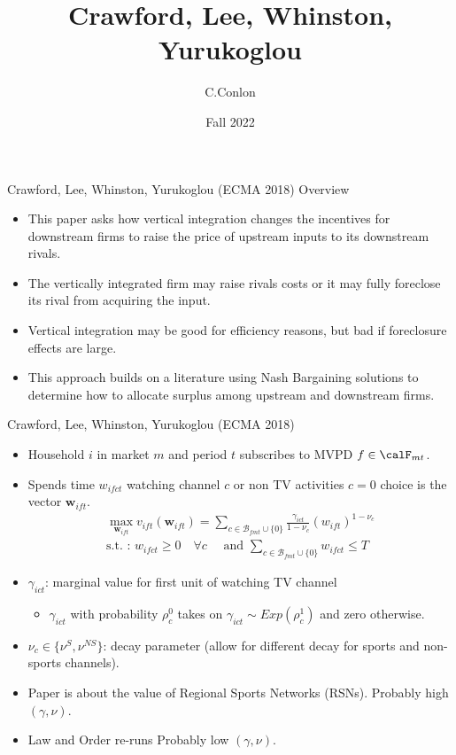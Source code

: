 

\title []{Crawford, Lee, Whinston, Yurukoglou}
\author{C.Conlon }
\date{Fall 2022}


\begin{frame}
\titlepage
\end{frame}




\begin{frame}{Crawford, Lee, Whinston, Yurukoglou (ECMA 2018)}
Overview
\begin{itemize}
\item This paper asks how vertical integration changes the incentives for \alert{downstream firms} to raise the price of upstream inputs to its downstream rivals.
\item The vertically integrated firm may \alert{raise rivals costs} or it may fully \alert{foreclose} its rival from acquiring the input.
\item Vertical integration may be good for efficiency reasons, but bad if foreclosure effects are large.
\item This approach builds on a literature using \alert{Nash Bargaining} solutions to determine how to allocate surplus among upstream and downstream firms.
\end{itemize}
\end{frame}

\begin{frame}{Crawford, Lee, Whinston, Yurukoglou (ECMA 2018)}
\begin{itemize}
\item Household $i$ in market $m$ and period $t$ subscribes to MVPD $f \in \calF_{mt}$.
\item Spends time $w_{ifct}$ watching channel $c$ or non TV activities $c=0$ choice is the vector $\symbf{w}_{ift}$.
\begin{eqnarray*}
\max_{\symbf{w}_{ift}} v_{ift}(\symbf{w}_{ift}) =  \sum_{c \in \mathcal{B}_{fmt} \cup \{0\}}  \frac{\gamma_{ict}}{1-\nu_c}(w_{ift})^{1-\nu_c}\\
\mbox{s.t. : } w_{ifct} \geq 0\quad  \forall c \quad \mbox{ and } \sum_{c \in \mathcal{B}_{fmt} \cup \{0\}} w_{ifct} \leq T
\end{eqnarray*}
\item $\gamma_{ict}$: marginal value for first unit of watching TV channel
\begin{itemize}
\item $\gamma_{ict}$ with probability $\rho_c^0$ takes on $\gamma_{ict} \sim Exp(\rho_c^1)$ and zero otherwise.
\end{itemize}
\item $\nu_c \in \{\nu^{S},\nu^{NS}\}$: decay parameter (allow for different decay for sports and non-sports channels).
\item Paper is about the value of \alert{Regional Sports Networks} (RSNs). Probably high $(\gamma,\nu)$.
\item Law and Order re-runs Probably low $(\gamma,\nu)$.
\end{itemize}
\end{frame}



